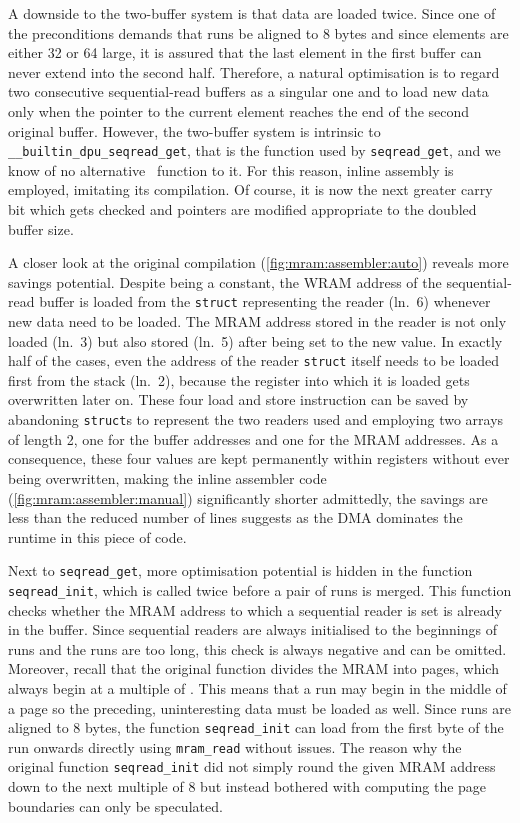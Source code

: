 A downside to the two-buffer system is that data are loaded twice.
Since one of the preconditions demands that runs be aligned to 8 bytes and since elements are either \qty{32}{\bits} or \qty{64}{\bits} large, it is assured that the last element in the first buffer can never extend into the second half.
Therefore, a natural optimisation is to regard two consecutive sequential-read buffers as a singular one and to load new data only when the pointer to the current element reaches the end of the second original buffer.
However, the two-buffer system is intrinsic to \lstinline|__builtin_dpu_seqread_get|, that is the function used by \lstinline|seqread_get|, and we know of no alternative \langC{}~function to it.
For this reason, inline assembly is employed, imitating its compilation.
Of course, it is now the next greater carry bit which gets checked and pointers are modified appropriate to the doubled buffer size.

A closer look at the original compilation (\cref{fig:mram:assembler:auto}) reveals more savings potential.
Despite being a constant, the \ac{WRAM} address of the sequential-read buffer is loaded from the \lstinline[keywords={}]|struct| representing the reader (ln.~6) whenever new data need to be loaded.
The \ac{MRAM} address stored in the reader is not only loaded (ln.~3) but also stored (ln.~5) after being set to the new value.
In exactly half of the cases, even the address of the reader \lstinline[keywords={}]|struct| itself needs to be loaded first from the stack (ln.~2), because the register into which it is loaded gets overwritten later on.
These four load and store instruction can be saved by abandoning \lstinline[keywords={}]|struct|s to represent the two readers used and employing two arrays of length 2, one for the buffer addresses and one for the \ac{MRAM} addresses.
As a consequence, these four values are kept permanently within registers without ever being overwritten, making the inline assembler code (\cref{fig:mram:assembler:manual}) significantly shorter \Dash admittedly, the savings are less than the reduced number of lines suggests as the \ac{DMA} dominates the runtime in this piece of code.

Next to \lstinline|seqread_get|, more optimisation potential is hidden in the function \lstinline|seqread_init|, which is called twice before a pair of runs is merged.
This function checks whether the \ac{MRAM} address to which a sequential reader is set is already in the buffer.
Since sequential readers are always initialised to the beginnings of runs and the runs are too long, this check is always negative and can be omitted.
Moreover, recall that the original function divides the \ac{MRAM} into pages, which always begin at a multiple of \seqreadcachesize{}.
This means that a run may begin in the middle of a page so the preceding, uninteresting data must be loaded as well.
Since runs are aligned to 8 bytes, the function \lstinline|seqread_init| can load from the first byte of the run onwards directly using \lstinline|mram_read| without issues.
The reason why the original function \lstinline|seqread_init| did not simply round the given \ac{MRAM} address down to the next multiple of 8 but instead bothered with computing the page boundaries can only be speculated.

